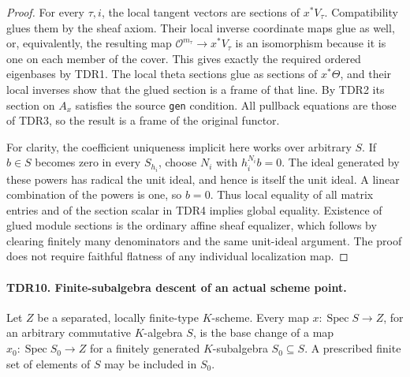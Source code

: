 \documentclass[11pt,a4paper]{article}
\numberwithin{equation}{section}
\theoremstyle{remark}\newtheorem{remark}[theorem]{Remark}
\begin{document}
\begin{proof}
For every \(\tau,i\), the local tangent vectors are sections
of \(x^*V_\tau\).  Compatibility glues them by the sheaf axiom.
Their local inverse coordinate maps glue as well, or, equivalently,
the resulting map \(\mathcal O^{m_\tau}\to x^*V_\tau\)
is an isomorphism because it is one on each member of the cover.
This gives exactly the required ordered eigenbases by TDR1.
The local theta sections glue as sections of \(x^*\Theta\),
and their local inverses show that the glued section is a frame
of that line.  By TDR2 its section on \(A_x\) satisfies the
source \texttt{gen} condition.  All pullback equations are those
of TDR3, so the result is a frame of the original functor.

For clarity, the coefficient uniqueness implicit here works over
arbitrary \(S\).  If \(b\in S\) becomes zero in every
\(S_{h_i}\), choose \(N_i\) with \(h_i^{N_i}b=0\).
The ideal generated by these powers has radical the unit ideal,
and hence is itself the unit ideal.  A linear combination of the
powers is one, so \(b=0\).  Thus local equality of all matrix
entries and of the section scalar in TDR4 implies global equality.
Existence of glued module sections is the ordinary affine sheaf
equalizer, which follows by clearing finitely many denominators
and the same unit-ideal argument.  The proof does not require
faithful flatness of any individual localization map.
\end{proof}

\paragraph{TDR10. Finite-subalgebra descent of an actual scheme point.}
\label{claim:TDR10}
Let \(Z\) be a separated, locally finite-type \(K\)-scheme.
Every map \(x:\operatorname{Spec}S\to Z\), for an arbitrary
commutative \(K\)-algebra \(S\), is the base change of a map
\(x_0:\operatorname{Spec}S_0\to Z\) for a finitely generated
\(K\)-subalgebra \(S_0\subseteq S\).  A prescribed finite
set of elements of \(S\) may be included in \(S_0\).
\end{document}

